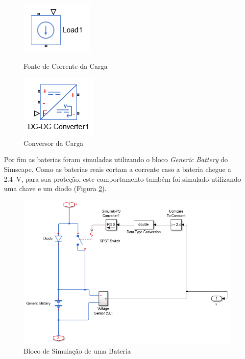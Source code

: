 \begin{figure}[!htpb]
\begin{minipage}{0.5\textwidth}
\begin{center}
\includegraphics[scale=0.5]{figures/loadSource.png}
\end{center}
\caption{Fonte de Corrente da Carga}
\label{figura_fonte_carga}
\end{minipage}
\begin{minipage}{0.5\textwidth}
\begin{center}
\includegraphics[scale=0.5]{figures/loadConverterBlock.png}
\end{center}
\caption{Conversor da Carga}
\label{figura_conversor_carga}
\end{minipage}
\end{figure}

Por fim as baterias foram simuladas utilizando o bloco \textit{Generic Battery} do Simscape. Como as baterias reais cortam a corrente caso a bateria chegue a \SI{2.4}{\volt}, para sua proteção, este comportamento também foi simulado utilizando uma chave e um diodo (Figura \ref{figura_bloco_bateria}).

\begin{figure}[!htpb]
\begin{center}
\includegraphics[scale=0.5]{figures/Battery.png}
\end{center}
\caption{Bloco de Simulação de uma Bateria}
\label{figura_bloco_bateria}
\end{figure}

